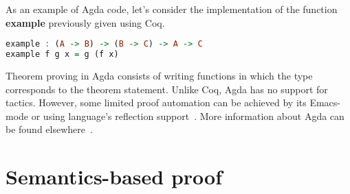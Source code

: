 As an example of Agda code, let's consider the implementation of the function \textbf{example}
previously given using Coq.



\begin{lstlisting}[language=haskell]
example : (A -> B) -> (B -> C) -> A -> C
example f g x = g (f x) 
\end{lstlisting}



Theorem proving in Agda consists of writing functions in which the type corresponds to the
theorem statement. Unlike Coq, Agda has no support for tactics. However, some limited proof
automation can be achieved by its Emacs-mode or using language's reflection support~\cite{Kokke15}.
More information about Agda can be found elsewhere~\cite{plfa2019}.


\section{Semantics-based proof}\label{sec:semantics}


